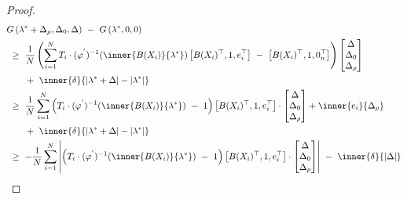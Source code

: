 \begin{proof}
\begin{align*}
  &
  G
   \left( 
\lambda^*
+\Delta_\rho,\Delta_0,\Delta
   \right)
   \ 
   -
   \ 
   G
   \left(
\lambda^*
,0,0
   \right)
   \\
   &
   \ 
   \ge
   \ 
   \frac{1}{N}
  \left( 
\sum_{i=1} 
  ^N
  T_i
  \cdot
  (
  \varphi^{'}
  )
  ^{-1}
  \!
  \left( 
\inner
{B(X_i)}
{
\lambda^*
}
  \right)
  \left[ 
    B(X_i)^\top,1,e_i^\top
  \right]
  \ 
  -
  \ 
  \left[ 
    B(X_i)^\top,1,0_n^\top
  \right]
  \right)
  \begin{bmatrix}
    \Delta
    \\
    \Delta_0
    \\
    \Delta_\rho
  \end{bmatrix}
    \\
  &
  \qquad
  +
  \ 
  \inner{\delta}
  {|
\lambda^*
+
\Delta
  |
  -
  |
\lambda^*
  |
}
\\
   &
   \ 
   \ge
   \ 
   \frac{1}{N}
\sum_{i=1} 
  ^N
  \left( 
    T_i\cdot
  (
  \varphi^{'}
  )
  ^{-1}
  \!
  \left( 
\inner
{B(X_i)}
{
\lambda^*
}
  \right)
  \ 
  -
  \ 
  1
  \right)
  \left[ 
    B(X_i)^\top,1,e_i^\top
  \right]
  \cdot
  \begin{bmatrix}
    \Delta
    \\
    \Delta_0
    \\
    \Delta_\rho
  \end{bmatrix}
  +
  \inner{e_i}{\Delta_\rho}
  \\
  &
  \qquad
  +
  \ 
  \inner{\delta}
  {|
\lambda^*
+
\Delta
  |
  -
  |
\lambda^*
  |
}
\\
   &
   \ 
   \ge
   \ 
   -
   \frac{1}{N}
\sum_{i=1} 
  ^N
  \left|
   \left( 
     T_i\cdot
  (
  \varphi^{'}
  )
  ^{-1}
  \!
  \left( 
\inner
{B(X_i)}
{
\lambda^*
}
  \right)
  \ 
  -
  \ 
  1
  \right)
  \left[ 
    B(X_i)^\top,1,e_i^\top
  \right]
  \cdot
  \begin{bmatrix}
    \Delta
    \\
    \Delta_0
    \\
    \Delta_\rho
  \end{bmatrix}
  \right|
    \ 
  -
  \ 
  \inner{\delta}
  {|
\Delta
  |
}
\end{align*}

\end{proof}
